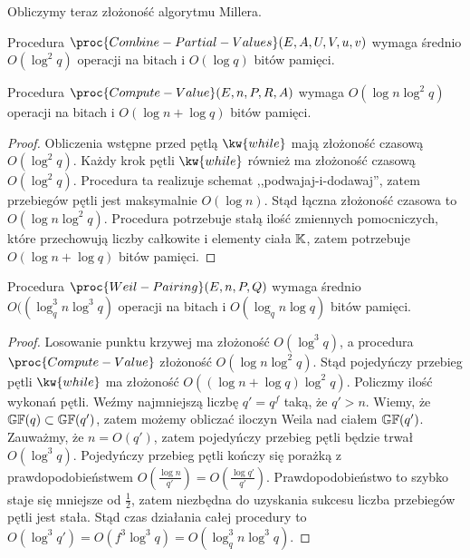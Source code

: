 \noindent
Obliczymy teraz złożoność algorytmu Millera.

\begin{fact}
Procedura $\proc{Combine-Partial-Values}(E, A, U, V, u, v)$ wymaga średnio
\linebreak $O(\log^2 q)$ operacji na bitach i $O(\log q)$ bitów pamięci.
\end{fact}

\begin{lemma}
Procedura $\proc{Compute-Value}(E, n, P, R, A)$ wymaga
$O(\log n \log^2 q)$ operacji na bitach i $O(\log n + \log q)$ bitów pamięci.
\end{lemma}

\begin{proof}
Obliczenia wstępne przed pętlą $\kw{while}$ mają złożoność czasową $O(\log^2 q)$.
Każdy krok pętli $\kw{while}$ również ma złożoność czasową $O(\log^2 q)$.
Procedura ta realizuje schemat ,,podwajaj-i-dodawaj'',
zatem przebiegów pętli jest maksymalnie $O(\log n)$.
Stąd łączna złożoność czasowa to $O(\log n \log^2q)$.
Procedura potrzebuje stałą ilość zmiennych pomocniczych,
które przechowują liczby całkowite i elementy ciała $\mathbb{K}$,
zatem potrzebuje $O(\log n + \log q)$ bitów pamięci.
\end{proof}

\begin{theorem}
Procedura $\proc{Weil-Pairing}(E, n, P, Q)$ wymaga średnio
$O((\log_q^3 n \log^3 q)$ operacji na bitach i $O(\log_q n \log q)$ bitów pamięci.
\end{theorem}

\begin{proof}
Losowanie punktu krzywej ma złożoność $O(\log^3 q)$,
a procedura $\proc{Compute-Value}$ złożoność $O(\log n \log^2 q)$.
Stąd pojedyńczy przebieg pętli $\kw{while}$ ma złożoność
$O((\log n + \log q)\log^2 q)$.
Policzmy ilość wykonań pętli.
Weźmy najmniejszą liczbę $q' = q^f$ taką, że $q' > n$.
Wiemy, że $\mathbb{GF}(q) \subset \mathbb{GF}(q')$, zatem możemy obliczać iloczyn Weila
nad ciałem $\mathbb{GF}(q')$.
Zauważmy, że $n = O(q')$, zatem pojedyńczy przebieg pętli będzie trwał
$O(\log^3 q)$.
Pojedyńczy przebieg pętli kończy się porażką z prawdopodobieństwem
$O(\frac{\log n}{q'}) = O(\frac{\log q'}{q'})$.
Prawdopodobieństwo to szybko staje się mniejsze od $\frac{1}{2}$,
zatem niezbędna do uzyskania sukcesu liczba przebiegów pętli jest stała.
Stąd czas działania całej procedury to
$O(\log^3 q') = O(f^3 \log^3 q) = O(\log_q^3 n \log^3 q)$.
\end{proof}
